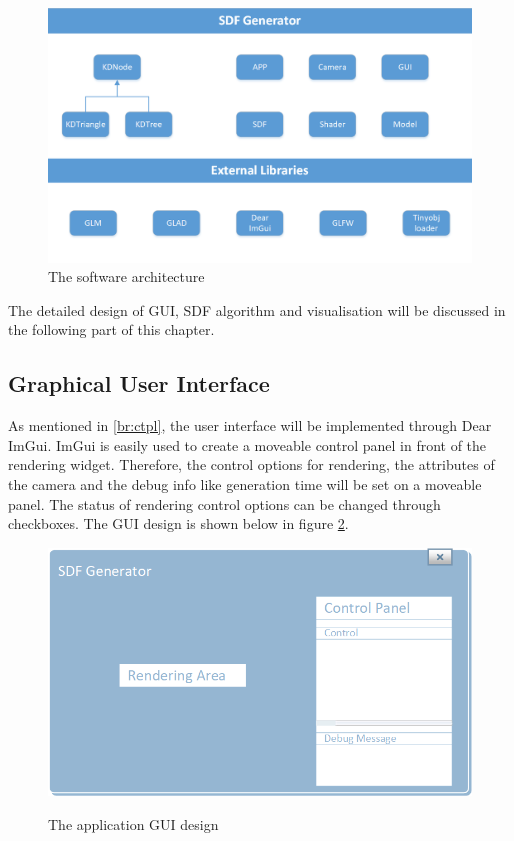 \begin{figure}[htbp]
    \centering
    \includegraphics[width=16cm]{Images/Chap3/Architecture.png}
    \caption{The software architecture}
    \label{ds:archi}
\end{figure}

The detailed design of GUI, SDF algorithm and visualisation will be discussed in the following part of this chapter.

\subsection{Graphical User Interface}

As mentioned in \ref{br:ctpl}, the user interface will be implemented through Dear ImGui. ImGui is easily used to create a moveable control panel in front of the rendering widget. Therefore, the control options for rendering, the attributes of the camera and the debug info like generation time will be set on a moveable panel. The status of rendering control options can be changed through checkboxes. The GUI design is shown below in figure \ref{ds:gui}. 

\begin{figure}[htbp]
    \centering
    \includegraphics[width=15cm]{Images/Chap3/GUIdesign.png}
    \label{ds:gui}
    \caption{The application GUI design}
\end{figure}

